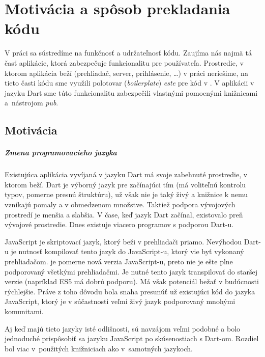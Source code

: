 \chapter{Motivácia a spôsob prekladania kódu}%

\label{kap:motivacia} %

V práci sa sústredíme na funkčnosť a udržateľnosť kódu. Zaujíma nás najmä tá časť aplikácie, ktorá zabezpečuje funkcionalitu pre používateľa. Prostredie, v ktorom aplikácia beží (prehliadač, server, prihlásenie, \ldots) v práci neriešime, na tieto časti kódu sme využili polotovar (\emph{boilerplate})
\emph{este} \cite{Este} pre kód v \JS{}. 
V aplikácii v jazyku Dart sme túto funkcionalitu zabezpečili vlastnými pomocnými knižnicami a~nástrojom \emph{pub}.

\section{Motivácia}
\paragraph{Zmena programovacieho jazyka}
Existujúca aplikácia vyvíjaná v jazyku Dart má svoje zabehnuté prostredie, v ktorom beží. Dart je výborný jazyk pre začínajúci tím (má voliteľnú kontrolu typov, pomerne presnú štruktúru), už však nie je taký živý a knižnice k nemu vznikajú pomaly a v obmedzenom množstve. 
Taktiež podpora vývojových prostredí je menšia a slabšia. V čase, keď jazyk Dart začínal, existovalo preň vývojové prostredie. Dnes existuje viacero programov s podporou Dart-u. 

JavaScript je skriptovací jazyk, ktorý beži v prehliadači priamo. Nevýhodou Dart-u je nutnosť kompilovať tento jazyk do JavaScript-u, ktorý vie byť vykonaný prehliadačom. \JS{} je pomerne nová verzia JavaScript-u, preto nie je ešte plne podporovaný všetkými prehliadačmi. Je nutné tento jazyk transpilovať do staršej verzie (napríklad ES5 má dobrú podporu). Má však potenciál bežať v budúcnosti rýchlejšie.
Práve z toho dôvodu bola snaha presunúť už existujúci kód do jazyka JavaScript, ktorý je v súčastnosti veľmi živý jazyk podporovaný mnohými komunitami. 

Aj keď majú tieto jazyky isté odlišnosti, sú navzájom veľmi podobné a bolo jednoduché prispôsobiť sa jazyku JavaScript po skúsenostiach s Dart-om.
Rozdiel bol viac v~použitých knižniciach ako v~samotných jazykoch.

